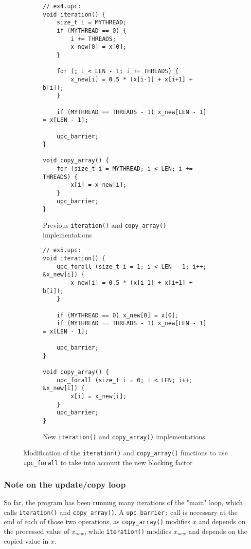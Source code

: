 \documentclass[12pt]{article}
\begin{document}
\begin{figure}[ht]
  \begin{subfigure}[b]{0.49\columnwidth}
    \begin{lstlisting}[style=C, numbers=none]
// ex4.upc:
void iteration() {
    size_t i = MYTHREAD;
    if (MYTHREAD == 0) {
        i += THREADS;
        x_new[0] = x[0];
    }

    for (; i < LEN - 1; i += THREADS) {
        x_new[i] = 0.5 * (x[i-1] + x[i+1] + b[i]);
    }

    if (MYTHREAD == THREADS - 1) x_new[LEN - 1] = x[LEN - 1];

    upc_barrier;
}

void copy_array() {
    for (size_t i = MYTHREAD; i < LEN; i += THREADS) {
        x[i] = x_new[i];
    }
    upc_barrier;
}
    \end{lstlisting}
    \caption{Previous \texttt{iteration()} and \texttt{copy\_array()} implementations}
  \end{subfigure}
  \hfill
  \begin{subfigure}[b]{0.49\columnwidth}
    \begin{lstlisting}[style=C, numbers=none]
// ex5.upc:
void iteration() {
    upc_forall (size_t i = 1; i < LEN - 1; i++; &x_new[i]) {
        x_new[i] = 0.5 * (x[i-1] + x[i+1] + b[i]);
    }

    if (MYTHREAD == 0) x_new[0] = x[0];
    if (MYTHREAD == THREADS - 1) x_new[LEN - 1] = x[LEN - 1];

    upc_barrier;
}

void copy_array() {
    upc_forall (size_t i = 0; i < LEN; i++; &x_new[i]) {
        x[i] = x_new[i];
    }
    upc_barrier;
}
    \end{lstlisting}
    \caption{New \texttt{iteration()} and \texttt{copy\_array()} implementations}
  \end{subfigure}
  \caption{Modification of the \texttt{iteration()} and \texttt{copy\_array()} functions to use \texttt{upc\_forall} to take into account the new blocking factor}
  \label{fig:laplace45b}
\end{figure}

\subsubsection{Note on the update/copy loop}

So far, the program has been running many iterations of the "main" loop, which calls \texttt{iteration()} and \texttt{copy\_array()}.
A \texttt{upc\_barrier;} call is necessary at the end of each of those two operations, as \texttt{copy\_array()} modifies $x$ and depends on the processed value of $x_{new}$, while \texttt{iteration()} modifies $x_{new}$ and depends on the copied value in $x$.

% 
\end{document}
